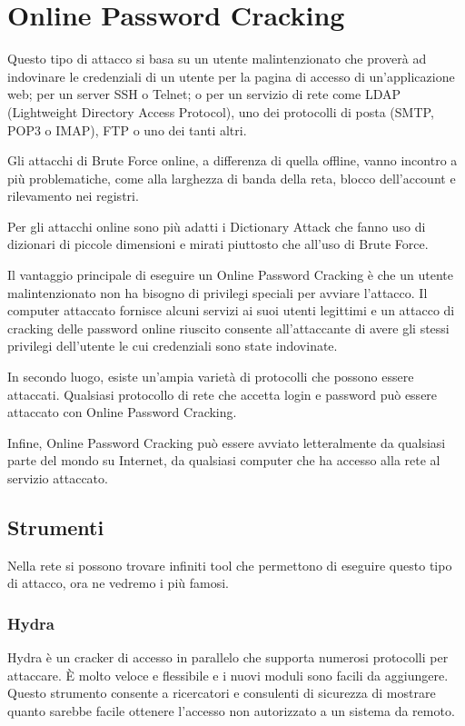 \chapter{Online Password Cracking}

Questo tipo di attacco si basa su un utente malintenzionato che proverà ad indovinare le credenziali di un utente per la pagina di accesso di un'applicazione web; per un server SSH o Telnet; o per un servizio di rete come LDAP (Lightweight Directory Access Protocol), uno dei protocolli di posta (SMTP, POP3 o IMAP), FTP o uno dei tanti altri.

Gli attacchi di Brute Force online, a differenza di quella offline, vanno incontro a più problematiche, come alla larghezza di banda della reta, blocco dell'account e rilevamento nei registri.

Per gli attacchi online sono più adatti i Dictionary Attack che fanno uso di dizionari di piccole dimensioni e mirati piuttosto che all'uso di Brute Force.

Il vantaggio principale di eseguire un Online Password Cracking è che un utente malintenzionato non ha bisogno di privilegi speciali per avviare l'attacco. Il computer attaccato fornisce alcuni servizi ai suoi utenti legittimi e un attacco di cracking delle password online riuscito consente all'attaccante di avere gli stessi privilegi dell'utente le cui credenziali sono state indovinate.

In secondo luogo, esiste un'ampia varietà di protocolli che possono essere attaccati. Qualsiasi protocollo di rete che accetta login e password può essere attaccato con Online Password Cracking.

Infine, Online Password Cracking può essere avviato letteralmente da qualsiasi parte del mondo su Internet, da qualsiasi computer che ha accesso alla rete al servizio attaccato.

\section{Strumenti}

Nella rete si possono trovare infiniti tool che permettono di eseguire questo tipo di attacco, ora ne vedremo i più famosi.

\subsection{Hydra}

Hydra \cite{hydra} è un cracker di accesso in parallelo che supporta numerosi protocolli per attaccare. È molto veloce e flessibile e i nuovi moduli sono facili da aggiungere. Questo strumento consente a ricercatori e consulenti di sicurezza di mostrare quanto sarebbe facile ottenere l'accesso non autorizzato a un sistema da remoto.

